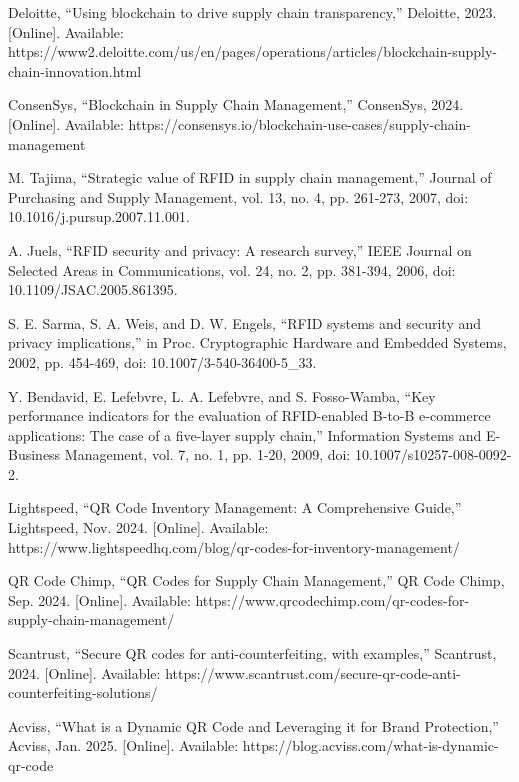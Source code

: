 \documentclass[conference]{IEEEtran}
\begin{document}
\begin{thebibliography}{00}
 Deloitte, ``Using blockchain to drive supply chain transparency,'' Deloitte, 2023. [Online]. Available: https://www2.deloitte.com/us/en/pages/operations/articles/blockchain-supply-chain-innovation.html

 ConsenSys, ``Blockchain in Supply Chain Management,'' ConsenSys, 2024. [Online]. Available: https://consensys.io/blockchain-use-cases/supply-chain-management

 M. Tajima, ``Strategic value of RFID in supply chain management,'' Journal of Purchasing and Supply Management, vol. 13, no. 4, pp. 261-273, 2007, doi: 10.1016/j.pursup.2007.11.001.

 A. Juels, ``RFID security and privacy: A research survey,'' IEEE Journal on Selected Areas in Communications, vol. 24, no. 2, pp. 381-394, 2006, doi: 10.1109/JSAC.2005.861395.

 S. E. Sarma, S. A. Weis, and D. W. Engels, ``RFID systems and security and privacy implications,'' in Proc. Cryptographic Hardware and Embedded Systems, 2002, pp. 454-469, doi: 10.1007/3-540-36400-5\_33.

 Y. Bendavid, E. Lefebvre, L. A. Lefebvre, and S. Fosso-Wamba, ``Key performance indicators for the evaluation of RFID-enabled B-to-B e-commerce applications: The case of a five-layer supply chain,'' Information Systems and E-Business Management, vol. 7, no. 1, pp. 1-20, 2009, doi: 10.1007/s10257-008-0092-2.

 Lightspeed, ``QR Code Inventory Management: A Comprehensive Guide,'' Lightspeed, Nov. 2024. [Online]. Available: https://www.lightspeedhq.com/blog/qr-codes-for-inventory-management/

 QR Code Chimp, ``QR Codes for Supply Chain Management,'' QR Code Chimp, Sep. 2024. [Online]. Available: https://www.qrcodechimp.com/qr-codes-for-supply-chain-management/

 Scantrust, ``Secure QR codes for anti-counterfeiting, with examples,'' Scantrust, 2024. [Online]. Available: https://www.scantrust.com/secure-qr-code-anti-counterfeiting-solutions/

 Acviss, ``What is a Dynamic QR Code and Leveraging it for Brand Protection,'' Acviss, Jan. 2025. [Online]. Available: https://blog.acviss.com/what-is-dynamic-qr-code


\end{thebibliography}
\end{document}
